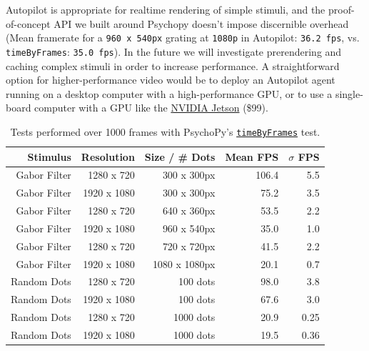 Autopilot is appropriate for realtime rendering of simple stimuli, and the proof-of-concept API we built around Psychopy doesn't impose discernible overhead (Mean framerate for a \texttt{960 x 540px} grating at \texttt{1080p} in Autopilot: \texttt{36.2 fps}, vs. \texttt{timeByFrames}: \texttt{35.0 fps}). In the future we will investigate prerendering and caching complex stimuli in order to increase performance. A straightforward option for higher-performance video would be to deploy an Autopilot agent running on a desktop computer with a high-performance GPU, or to use a single-board computer with a GPU like the \href{https://www.nvidia.com/en-us/autonomous-machines/embedded-systems/jetson-nano/}{NVIDIA Jetson} (\$99).



\begin{table}
\caption{Tests performed over 1000 frames with PsychoPy's \href{https://github.com/psychopy/psychopy/blob/3.1/psychopy/demos/coder/timing/timeByFrames.py}{\texttt{timeByFrames}} test.}
    \begin{tabular}{rrr|rr}
        \toprule
        \textbf{Stimulus} & \textbf{Resolution} & \textbf{Size / \# Dots}& \textbf{Mean FPS} & \textbf{$\sigma$ FPS} \\
        \midrule 
        Gabor Filter & 1280 x 720  & 300 x 300px & 106.4 & 5.5 \\
        Gabor Filter & 1920 x 1080 & 300 x 300px & 75.2 & 3.5\\
        Gabor Filter & 1280 x 720 & 640 x 360px & 53.5 & 2.2\\ 
        Gabor Filter & 1920 x 1080 & 960 x 540px & 35.0 & 1.0 \\
        Gabor Filter & 1280 x 720 & 720 x 720px & 41.5 & 2.2 \\
        Gabor Filter & 1920 x 1080 & 1080 x 1080px & 20.1 & 0.7 \\
        Random Dots & 1280 x 720 & 100 dots & 98.0 & 3.8 \\
        Random Dots & 1920 x 1080 & 100 dots & 67.6 & 3.0 \\
        Random Dots & 1280 x 720 & 1000 dots & 20.9 & 0.25 \\
        Random Dots & 1920 x 1080 & 1000 dots & 19.5 & 0.36 \\
        \bottomrule
    \end{tabular}
    \label{tab:fpstests}
\end{table}


